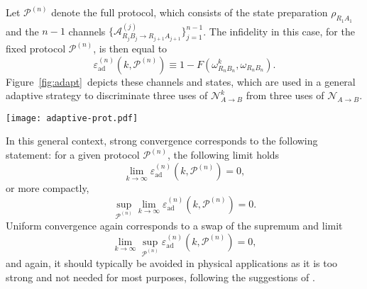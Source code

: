 \documentclass[apsrev,twocolumn]{revtex4-1}%
\begin{document}
Let $\mathcal{P}^{(n)}$ denote the full protocol, which consists of the state
preparation $\rho_{R_{1}A_{1}}$ and the $n-1$ channels $\{\mathcal{A}%
_{R_{j}B_{j}\rightarrow R_{j+1}A_{j+1}}^{(j)}\}_{j=1}^{n-1}$. The infidelity
in this case, for the fixed protocol $\mathcal{P}^{(n)}$, is then equal to%
\begin{equation}
\varepsilon_{\text{ad}}^{(n)}(k,\mathcal{P}^{(n)})\equiv1-F(\omega_{R_{n}%
B_{n}}^{k},\omega_{R_{n}B_{n}}). \label{eq:adap-err}%
\end{equation}
Figure~\ref{fig:adapt}\ depicts these channels and states, which are used in a
general adaptive strategy to discriminate three uses of $\mathcal{N}%
_{A\rightarrow B}^{k}$ from three uses of $\mathcal{N}_{A\rightarrow B}$.

\begin{figure*}[ptb]
\begin{center}
\texttt{[image: adaptive-prot.pdf]}
\end{center}
\caption{Adaptive protocol for distinguishing three uses of the channel
$\mathcal{N}_{A\rightarrow B}^{k}$ from three uses of $\mathcal{N}%
_{A\rightarrow B}$. The protocol is denoted by $\mathcal{P}^{(3)}$ and
consists of state preparation $\rho_{R_{1}A_{1}}$, as well as the channels
$\mathcal{A}_{R_{1}B_{1}\rightarrow R_{2}A_{2}}^{(1)}$ and $\mathcal{A}%
_{R_{2}B_{2}\rightarrow R_{3}A_{3}}^{(2)}$. (a) The protocol $\mathcal{P}%
^{(3)}$ is used with three uses of the channel $\mathcal{N}_{A\rightarrow
B}^{k}$, and the final state is $\omega_{R_{3}B_{3}}^{k}$. (b) The protocol
$\mathcal{P}^{(3)}$ is used with three uses of the channel $\mathcal{N}%
_{A\rightarrow B}$, and the final state is $\omega_{R_{3}B_{3}}$. Strong
convergence of the channel sequence $\{\mathcal{N}_{A\rightarrow B}^{k}\}_{k}$
to $\mathcal{N}_{A\rightarrow B}$ implies that, given a fixed protocol
$\mathcal{P}^{(3)}$, the infidelity of the states $\omega_{R_{3}B_{3}}^{k}$
and $\omega_{R_{3}B_{3}}$ converges to zero in the limit as $k\rightarrow
\infty$.}%
\label{fig:adapt}%
\end{figure*}

In this general context, strong convergence corresponds to the following
statement: for a given protocol $\mathcal{P}^{(n)}$, the following limit holds%
\begin{equation}
\lim_{k\rightarrow\infty}\varepsilon_{\text{ad}}^{(n)}(k,\mathcal{P}^{(n)})=0,
\end{equation}
or more compactly,%
\begin{equation}
\sup_{\mathcal{P}^{(n)}}\lim_{k\rightarrow\infty}\varepsilon_{\text{ad}}%
^{(n)}(k,\mathcal{P}^{(n)})=0.
\end{equation}
Uniform convergence again corresponds to a swap of the supremum and limit%
\begin{equation}
\lim_{k\rightarrow\infty}\sup_{\mathcal{P}^{(n)}}\varepsilon_{\text{ad}}%
^{(n)}(k,\mathcal{P}^{(n)})=0,
\end{equation}
and again, it should typically be avoided in physical applications as it is
too strong and not needed for most purposes, following the suggestions of
\cite[Section~3]{SH08}.
\end{document}
